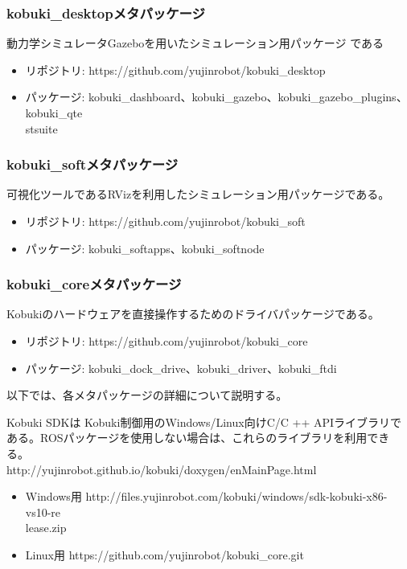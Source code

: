 \subsubsection{kobuki\_desktopメタパッケージ}

動力学シミュレータGazeboを用いたシミュレーション用パッケージ   である

\begin{itemize}
\item リポジトリ: https://github.com/yujinrobot/kobuki\_desktop
\item パッケージ: kobuki\_dashboard、kobuki\_gazebo、kobuki\_gazebo\_plugins、kobuki\_qte\\stsuite
\end{itemize}

\subsubsection{kobuki\_softメタパッケージ}

可視化ツールであるRVizを利用したシミュレーション用パッケージである。

\begin{itemize}
\item リポジトリ: https://github.com/yujinrobot/kobuki\_soft
\item パッケージ: kobuki\_softapps、kobuki\_softnode
\end{itemize}

\subsubsection{kobuki\_coreメタパッケージ}

Kobukiのハードウェアを直接操作するためのドライバパッケージである。

\begin{itemize}
\item リポジトリ: https://github.com/yujinrobot/kobuki\_core
\item パッケージ: kobuki\_dock\_drive、kobuki\_driver、kobuki\_ftdi
\end{itemize}

以下では、各メタパッケージの詳細について説明する。

\begin{exercise}
  Kobuki SDKは Kobuki制御用のWindows/Linux向けC/C ++ APIライブラリである。ROSパッケージを使用しない場合は、これらのライブラリを利用できる。\\
  http://yujinrobot.github.io/kobuki/doxygen/enMainPage.html

  \begin{itemize}
  \item Windows用
  http://files.yujinrobot.com/kobuki/windows/sdk-kobuki-x86-vs10-re\\lease.zip
  \item Linux用
  https://github.com/yujinrobot/kobuki\_core.git
  \end{itemize}
\end{exercise}


